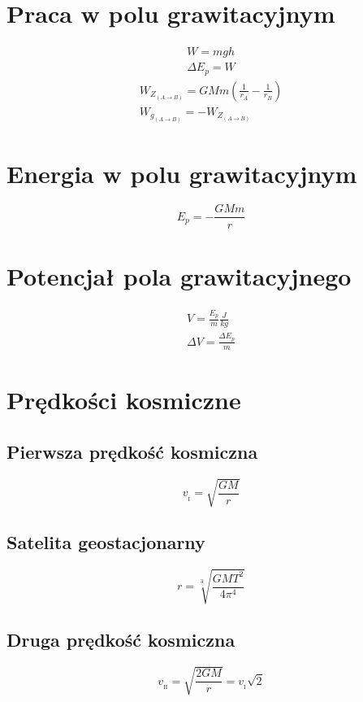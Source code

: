     \section{Praca w polu grawitacyjnym}
      \begin{gather}
        W = mgh\\
        \Delta E_p = W
      \end{gather}
      \begin{gather}
        W_{Z_{(A\rightarrow B)}} = GMm\left(\frac{1}{r_A} - \frac{1}{r_B}\right)\\
        W_{g_{(A\rightarrow B)}} = -W_{Z_{(A\rightarrow B)}}
      \end{gather}
    \section{Energia w polu grawitacyjnym}
      \begin{equation}
        E_p = -\frac{GMm}{r}
      \end{equation}
    \section{Potencjał pola grawitacyjnego}
      \begin{gather}
        V = \frac{E_p}{m} \unit{\frac{J}{kg}}\\
        \Delta V = \frac{\Delta E_p}{m}
      \end{gather}
    \section{Prędkości kosmiczne}
      \subsection{Pierwsza prędkość kosmiczna}
        \begin{equation}
          v_{{}_\mathrm{I}} = \sqrt{\frac{GM}{r}}
        \end{equation}
      \subsection{Satelita geostacjonarny}
        \begin{equation}
          r = \sqrt[3]{\frac{GMT^2}{4\pi^4}}
        \end{equation}
      \subsection{Druga prędkość kosmiczna}
        \begin{equation}
          v_{{}_\mathrm{II}} = \sqrt{\frac{2GM}{r}} = v_{{}_\mathrm{I}}\sqrt{2}
        \end{equation}
